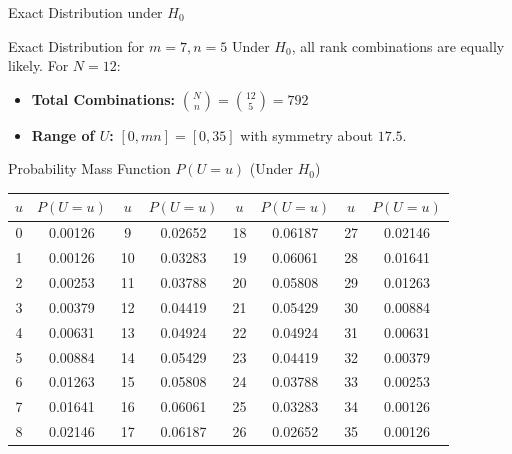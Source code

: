 \documentclass[8pt]{beamer}
\begin{document}
\begin{frame}{Exact Distribution under $H_0$}
    \vspace{-0.2cm}
    \begin{block}{Exact Distribution for $m=7, n=5$}
        \footnotesize
        Under $H_0$, all rank combinations are equally likely. For $N=12$:
        \begin{itemize}
            \item \textbf{Total Combinations:} $\binom{N}{n} = \binom{12}{5} = 792$
            \item \textbf{Range of $U$:} $[0, mn] = [0, 35]$ with symmetry about $17.5$.
        \end{itemize}
    \end{block}

    \begin{block}{Probability Mass Function $P(U=u)$ (Under $H_0$)}
        \centering
        \fontsize{5.5pt}{6pt}\selectfont
        \begin{tabular}{cc|cc|cc|cc}
            \toprule
            $u$ & $P(U=u)$ & $u$ & $P(U=u)$ & $u$ & $P(U=u)$ & $u$ & $P(U=u)$ \\
            \midrule
            0 & 0.00126 & 9 & 0.02652 & 18 & 0.06187 & 27 & 0.02146 \\
            1 & 0.00126 & 10 & 0.03283 & 19 & 0.06061 & 28 & 0.01641 \\
            2 & 0.00253 & 11 & 0.03788 & 20 & 0.05808 & 29 & 0.01263 \\
            3 & 0.00379 & 12 & 0.04419 & 21 & 0.05429 & 30 & 0.00884 \\
            4 & 0.00631 & 13 & 0.04924 & 22 & 0.04924 & 31 & 0.00631 \\
            5 & 0.00884 & 14 & 0.05429 & 23 & 0.04419 & 32 & 0.00379 \\
            6 & 0.01263 & 15 & 0.05808 & 24 & 0.03788 & 33 & 0.00253 \\
            7 & 0.01641 & 16 & 0.06061 & 25 & 0.03283 & 34 & 0.00126 \\
            8 & 0.02146 & 17 & 0.06187 & 26 & 0.02652 & 35 & 0.00126 \\
            \bottomrule
        \end{tabular}
    \end{block}
\end{frame}
\end{document}
